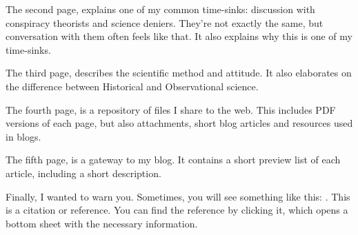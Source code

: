 \begin{multicols}{2}
The second page,  explains one of my common time-sinks: discussion with conspiracy theorists and science deniers. They're not exactly the same, but conversation with them often feels like that. It also explains why this is one of my time-sinks.

The third page,  describes the scientific method and attitude. It also elaborates on the difference between Historical and Observational science.

The fourth page,  is a repository of files I share to the web. This includes PDF versions of each page, but also attachments, short blog articles and resources used in blogs. 

The fifth page,  is a gateway to my blog. It contains a short preview list of each article, including a short description.

Finally, I wanted to warn you. Sometimes, you will see something like this: \cite{crediblehulk}. This is a citation or reference. You can find the reference by clicking it, which opens a bottom sheet with the necessary information.

\end{multicols}